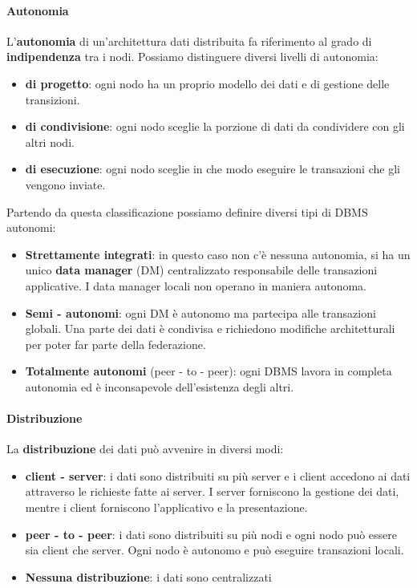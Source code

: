 \paragraph{Autonomia} L'\textbf{autonomia} di un'architettura dati distribuita
fa riferimento al grado di \textbf{indipendenza} tra i nodi. Possiamo distinguere
diversi livelli di autonomia:
\begin{itemize}
      \item \textbf{di progetto}: ogni nodo ha un proprio modello dei
            dati e di gestione delle transizioni.
      \item \textbf{di condivisione}: ogni nodo sceglie la porzione di
            dati da condividere con gli altri nodi.
      \item \textbf{di esecuzione}: ogni nodo sceglie in che modo eseguire
            le transazioni che gli vengono inviate.
\end{itemize}
Partendo da questa classificazione possiamo definire diversi tipi di DBMS autonomi:
\begin{itemize}
      \item \textbf{Strettamente integrati}: in questo caso non c'è nessuna
            autonomia, si ha un unico \textbf{data manager} (DM) centralizzato
            responsabile delle transazioni applicative. I data
            manager locali non operano in maniera autonoma.
      \item \textbf{Semi - autonomi}: ogni DM è autonomo ma partecipa
            alle transazioni globali. Una parte dei dati è condivisa e richiedono
            modifiche architetturali per poter far parte della federazione.
      \item \textbf{Totalmente autonomi} (peer - to - peer): ogni DBMS lavora in
            completa autonomia ed è inconsapevole dell'esistenza degli altri.
\end{itemize}
\paragraph{Distribuzione} La \textbf{distribuzione} dei dati può avvenire in diversi
modi:
\begin{itemize}
      \item \textbf{client - server}: i dati sono distribuiti su più server
            e i client accedono ai dati attraverso le richieste fatte ai server.
            I server forniscono la gestione dei dati, mentre i client forniscono
            l'applicativo e la presentazione.
      \item \textbf{peer - to - peer}: i dati sono distribuiti su più nodi
            e ogni nodo può essere sia client che server. Ogni nodo è autonomo
            e può eseguire transazioni locali.
      \item \textbf{Nessuna distribuzione}: i dati sono centralizzati
\end{itemize}
